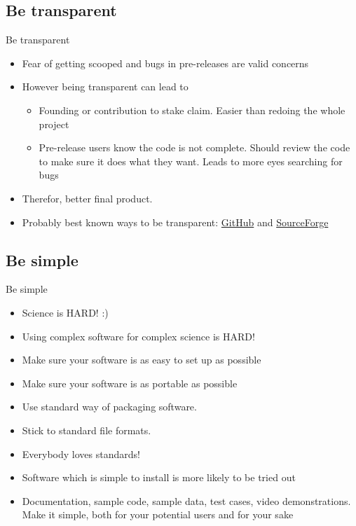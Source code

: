 \documentclass{beamer}
\begin{document}
\subsection{Be transparent}

\begin{frame}{Be transparent}
\begin{itemize}
\item Fear of getting scooped and bugs in pre-releases are valid concerns
\item However being transparent can lead to
	\begin{itemize}
	\item Founding or contribution to stake claim. Easier than redoing the whole project
	\item Pre-release users know the code is not complete. Should review the code to make sure it does what they want. Leads to more eyes searching for bugs
	\end{itemize}
\item Therefor, better final product.
\item Probably best known ways to be transparent: \href{https://github.com}{GitHub} and \href{https://sourceforge.net}{SourceForge}
\end{itemize}
\end{frame}

\subsection{Be simple}

\begin{frame}{Be simple}
\begin{itemize}
\item Science is HARD! :)
\pause 
\item Using complex software for complex science is HARD!

\pause 
\item Make sure your software is as easy to set up as possible
\unpause
\item Make sure your software is as portable as possible
\item Use standard way of packaging software. 
\item Stick to standard file formats.
\item Everybody loves standards!
\item Software which is simple to install is more likely to be tried out
\item Documentation, sample code, sample data, test cases, video demonstrations. Make it simple, both for your potential users and for your sake
\end{itemize}
\end{frame}
\end{document}
